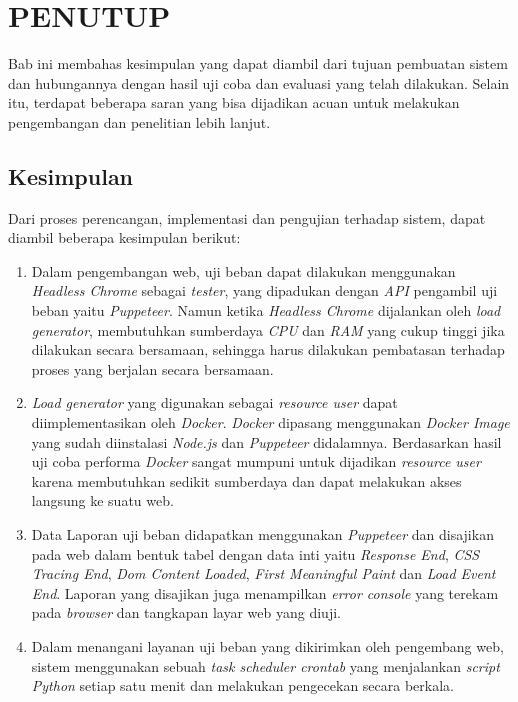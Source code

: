 \chapter{PENUTUP}
    Bab ini membahas kesimpulan yang dapat diambil dari tujuan pembuatan sistem dan hubungannya dengan hasil uji coba dan evaluasi yang telah dilakukan. Selain itu, terdapat beberapa saran yang bisa dijadikan acuan untuk melakukan pengembangan dan penelitian lebih lanjut.
        
	\section{Kesimpulan}
        Dari proses perencangan, implementasi dan pengujian terhadap sistem, dapat diambil beberapa kesimpulan berikut:
        \begin{enumerate}
        	\item Dalam pengembangan web, uji beban dapat dilakukan menggunakan \textit{Headless Chrome} sebagai \textit{tester}, yang dipadukan dengan \textit{API} pengambil uji beban yaitu \textit{Puppeteer}. Namun ketika \textit{Headless Chrome} dijalankan oleh \textit{load generator}, membutuhkan sumberdaya \textit{CPU} dan \textit{RAM} yang cukup tinggi jika dilakukan secara bersamaan, sehingga harus dilakukan pembatasan terhadap proses yang berjalan secara bersamaan.
     		\item \textit{Load generator} yang digunakan sebagai \textit{resource user} dapat diimplementasikan oleh \textit{Docker}. \textit{Docker} dipasang menggunakan \textit{Docker Image} yang sudah diinstalasi \textit{Node.js} dan \textit{Puppeteer} didalamnya. Berdasarkan hasil uji coba performa \textit{Docker} sangat mumpuni untuk dijadikan \textit{resource user} karena membutuhkan sedikit sumberdaya dan dapat melakukan akses langsung ke suatu web.
        	\item Data Laporan uji beban didapatkan menggunakan \textit{Puppeteer} dan disajikan pada web dalam bentuk tabel dengan data inti yaitu \textit{Response End}, \textit{CSS Tracing End}, \textit{Dom Content Loaded}, \textit{First Meaningful Paint} dan \textit{Load Event End}. Laporan yang disajikan juga menampilkan \textit{error console} yang terekam pada \textit{browser} dan tangkapan layar web yang diuji.
        	\item Dalam menangani layanan uji beban yang dikirimkan oleh pengembang web, sistem menggunakan sebuah \textit{task scheduler crontab} yang menjalankan \textit{script Python} setiap satu menit dan melakukan pengecekan secara berkala.
        \end{enumerate}
        
